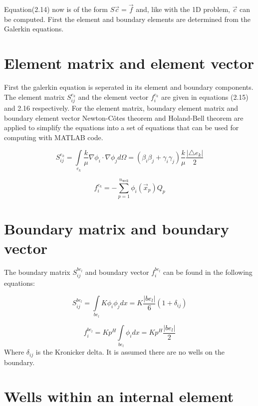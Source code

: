 \documentclass[a4paper]{report}
\begin{document}
Equation(2.14) now is of the form $S\vec{c}=\vec{f}$ and, like with the 1D problem,  $\vec{c}$ can be computed. First the element and boundary elements are determined from the Galerkin equations.


\section{Element matrix and element vector}

First the galerkin equation is seperated in its element and boundary components. The element matrix $S^{e_k}_{ij}$ and the element vector $f^{e_k}_i$ are given in equations (2.15) and 2.16 respectively. For the element matrix, boundary element matrix and boundary element vector Newton-Côtes theorem and Holand-Bell theorem are applied to simplify the equations into a set of equations that can be used for computing with MATLAB code.

\begin{equation}
	S^{e_k}_{ij} = \int\limits_{e_k}\frac{k}{\mu}\nabla\phi_i\cdot\nabla \phi_j d\Omega = (\beta_i\beta_j+\gamma_i\gamma_j)\frac{k}{\mu}\frac{\lvert\triangle e_k\rvert}{2}
\end{equation}

\begin{equation}\label{f_i_ek}
	f^{e_k}_i =  -\sum_{p=1}^{n_{\text{well}}}\phi_i(\vec{x}_p) Q_p
\end{equation}


\section{Boundary matrix and boundary vector}

The boundary matrix $S^{be_l}_{ij}$ and boundary vector $f^{be_l}_i$ can be found in the following equations:

\begin{equation}
	S^{be_l}_{ij} = \int\limits_{be_l} K\phi_i \phi_j dx = K\frac{\lvert be_l\rvert}{6}(1+\delta_{ij})
\end{equation}

\begin{equation}
	f^{be_l}_i = Kp^H\int\limits_{be_l}\phi_i dx = K p^H \frac{\lvert be_l\rvert}{2}
\end{equation}
Where $\delta_{ij}$ is the Kronicker delta. It is assumed there are no wells on the boundary.

\section{Wells within an internal element}
\end{document}
